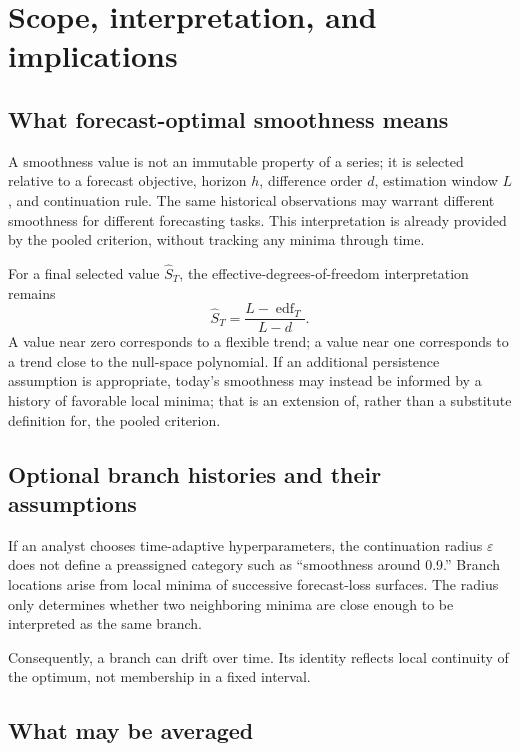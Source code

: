 \section{Scope, interpretation, and implications}

\subsection{What forecast-optimal smoothness means}

A smoothness value is not an immutable property of a series; it is selected relative to a forecast objective, horizon $h$, difference order $d$, estimation window $L$, and continuation rule. The same historical observations may warrant different smoothness for different forecasting tasks. This interpretation is already provided by the pooled criterion, without tracking any minima through time.

For a final selected value $\widehat S_T$, the effective-degrees-of-freedom interpretation remains
\begin{equation}
\label{eq:scope_smoothness_edf}
\widehat S_T
=
\frac{L-\operatorname{edf}_T}{L-d}.
\end{equation}
A value near zero corresponds to a flexible trend; a value near one corresponds to a trend close to the null-space polynomial. If an additional persistence assumption is appropriate, today's smoothness may instead be informed by a history of favorable local minima; that is an extension of, rather than a substitute definition for, the pooled criterion.

\subsection{Optional branch histories and their assumptions}

If an analyst chooses time-adaptive hyperparameters, the continuation radius $\varepsilon$ does not define a preassigned category such as ``smoothness around 0.9.'' Branch locations arise from local minima of successive forecast-loss surfaces. The radius only determines whether two neighboring minima are close enough to be interpreted as the same branch.

Consequently, a branch can drift over time. Its identity reflects local continuity of the optimum, not membership in a fixed interval.

\subsection{What may be averaged}

